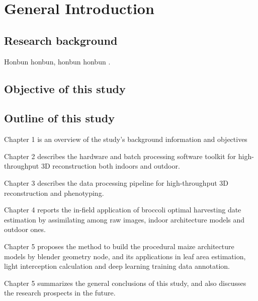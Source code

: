 \chapter{General Introduction}

\section{Research background}

Honbun honbun, honbun honbun \citep{guo_deep_2019, zhao_crop_2019}. 


\section{Objective of this study}


\section{Outline of this study}

Chapter 1 is an overview of the study's background information and objectives

Chapter 2 describes the hardware and batch processing software toolkit for high-throughput 3D reconstruction both indoors and outdoor.

Chapter 3 describes the data processing pipeline for high-throughput 3D reconstruction and phenotyping.

Chapter 4 reports the in-field application of broccoli optimal harvesting date estimation by assimilating among raw images, indoor architecture models and outdoor ones.

Chapter 5 proposes the method to build the procedural maize architecture models by blender geometry node, and its applications in leaf area estimation, light interception calculation and deep learning training data annotation.

Chapter 5 summarizes the general conclusions of this study, and also discusses the research prospects in the future.